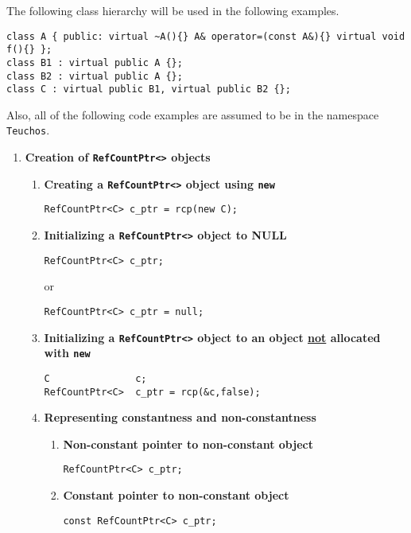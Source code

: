\documentclass[pdf,ps2pdf,11pt]{SANDreport}
\begin{document}
The following class hierarchy will be used in the following
examples.
%
{\small\begin{verbatim}
class A { public: virtual ~A(){} A& operator=(const A&){} virtual void f(){} };
class B1 : virtual public A {};
class B2 : virtual public A {};
class C : virtual public B1, virtual public B2 {};
\end{verbatim}}
%
Also, all of the following code examples are assumed to be in the
namespace {}\texttt{Teuchos}.

\begin{enumerate}

\item {\bf Creation of \texttt{RefCountPtr<>} objects}

\begin{enumerate}

\item {\bf Creating a \texttt{RefCountPtr<>} object using \texttt{new}}
\label{rcpqs:apdx:qs:new}
%
{\small\begin{verbatim}
RefCountPtr<C> c_ptr = rcp(new C);
\end{verbatim}}
%
\item {\bf Initializing a \texttt{RefCountPtr<>} object to NULL}
\label{rcpqs:apdx:qs:null}
%
{\small\begin{verbatim}
RefCountPtr<C> c_ptr;
\end{verbatim}}
or
{\small\begin{verbatim}
RefCountPtr<C> c_ptr = null;
\end{verbatim}}
%
\item {\bf Initializing a \texttt{RefCountPtr<>} object to an object
       \underline{not} allocated with \texttt{new}}
\label{rcpqs:apdx:qs:not-new}
%
{\small\begin{verbatim}
C               c;
RefCountPtr<C>  c_ptr = rcp(&c,false);
\end{verbatim}}
%
%
\item {\bf Representing constantness and non-constantness}
%
\begin{enumerate}
%
\item {\bf Non-constant pointer to non-constant object }
{\small\begin{verbatim}
RefCountPtr<C> c_ptr;
\end{verbatim}}
%
\item {\bf Constant pointer to non-constant object }
{\small\begin{verbatim}
const RefCountPtr<C> c_ptr;
\end{verbatim}}

\end{enumerate}
\end{enumerate}
\end{enumerate}
\end{document}
